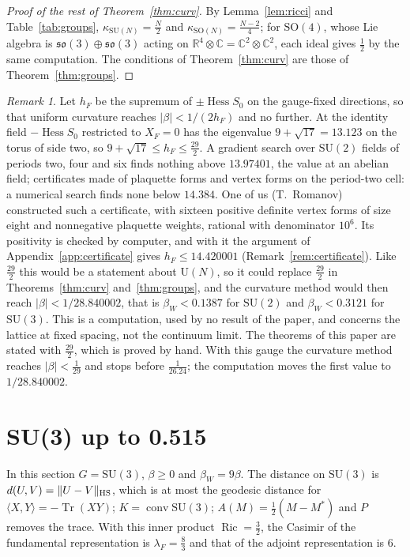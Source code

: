 \documentclass[aps,prd,twocolumn,superscriptaddress,nofootinbib,longbibliography,floatfix,amsmath,amssymb,10pt]{revtex4-2}
\theoremstyle{definition}
\theoremstyle{remark}
\newtheorem{remark}[theorem]{Remark}
\newcommand{\R}{\mathbb{R}}
\newcommand{\C}{\mathbb{C}}
\newcommand{\SU}{\mathrm{SU}}
\newcommand{\SO}{\mathrm{SO}}
\newcommand{\U}{\mathrm{U}}
\newcommand{\Tr}{\operatorname{Tr}}
\newcommand{\Hess}{\operatorname{Hess}}
\newcommand{\Ric}{\operatorname{Ric}}
\newcommand{\ip}[2]{\langle #1,#2\rangle}
\begin{document}
\begin{proof}[Proof of the rest of Theorem~\ref{thm:curv}]
By Lemma~\ref{lem:ricci} and Table~\ref{tab:groups}, $\kappa_{\SU(N)}=\frac N2$
and $\kappa_{\SO(N)}=\frac{N-2}4$; for $\SO(4)$, whose Lie algebra is
$\mathfrak{so}(3)\oplus\mathfrak{so}(3)$ acting on $\R^4\otimes\C=\C^2\otimes\C^2$,
each ideal gives $\frac12$ by the same computation. The conditions of Theorem~\ref{thm:curv}
are those of Theorem~\ref{thm:groups}.
\end{proof}

\begin{remark}\label{rem:hf}
Let $h_F$ be the supremum of $\pm\Hess S_0$ on the gauge-fixed directions, so
that uniform curvature reaches $|\beta|<1/(2h_F)$ and no further. At the
identity field $-\Hess S_0$ restricted to $X_F=0$ has the eigenvalue
$9+\sqrt{17}=13.123$ on the torus of side two, so $9+\sqrt{17}\le h_F\le\frac{29}2$.
A gradient search over $\SU(2)$ fields of periods two, four and six finds
nothing above $13.97401$, the value at an abelian field; certificates made of
plaquette forms and vertex forms on the period-two cell: a numerical search finds none below
$14.384$. One of us (T.~Romanov)~\cite{Rom26} constructed such a certificate, with sixteen
positive definite vertex forms of size eight and nonnegative plaquette
weights, rational with denominator $10^6$. Its positivity is checked by
computer, and with it the argument of Appendix~\ref{app:certificate} gives
$h_F\le14.420001$ (Remark~\ref{rem:certificate}). Like $\frac{29}2$ this
would be a statement about $\U(N)$, so it could replace $\frac{29}2$ in
Theorems~\ref{thm:curv} and~\ref{thm:groups}, and the curvature method
would then reach $|\beta|<1/28.840002$, that is $\beta_W<0.1387$ for
$\SU(2)$ and $\beta_W<0.3121$ for $\SU(3)$. This is a computation, used
by no result of the paper, and concerns the lattice at fixed spacing, not
the continuum limit. The theorems of this paper are stated with
$\frac{29}2$, which is proved by hand. With this gauge the curvature
method reaches $|\beta|<\frac1{29}$ and stops before $\frac1{26.24}$; the
computation moves the first value to $1/28.840002$.
\end{remark}

\section{SU(3) up to 0.515}\label{sec:su3}

In this section $G=\SU(3)$, $\beta\ge0$ and $\beta_W=9\beta$. The distance on
$\SU(3)$ is $d(U,V)=\|U-V\|_{\rm HS}$, which is at most the geodesic distance
for $\ip XY=-\Tr(XY)$; $K=\operatorname{conv}\SU(3)$; $A(M)=\frac12(M-M^*)$
and $P$ removes the trace. With this inner product $\Ric=\frac32$, the
Casimir of the fundamental representation is $\lambda_F=\frac83$ and that of
the adjoint representation is $6$.
\end{document}
